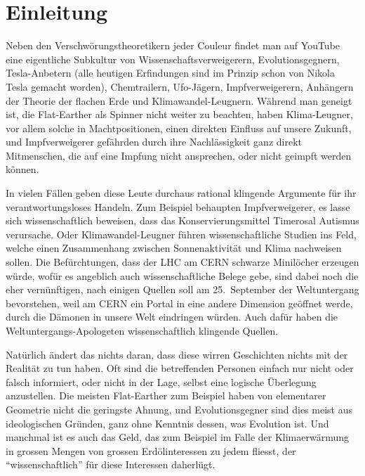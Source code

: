 %
%
%
\chapter*{Einleitung}
Neben den Verschwörungstheoretikern jeder Couleur findet man
auf YouTube eine eigentliche Subkultur von Wissenschaftsverweigerern,
Evolutionsgegnern, Tesla-Anbetern (alle heutigen Erfindungen sind im
Prinzip schon von Nikola Tesla gemacht worden), Chemtrailern, 
Ufo-Jägern,
Impfverweigerern, Anhängern der Theorie der flachen Erde
und Klimawandel-Leugnern.
Während man geneigt ist, die Flat-Earther als Spinner nicht weiter
zu beachten, haben Klima-Leugner, vor allem solche in Machtpositionen,
einen direkten Einfluss auf unsere Zukunft, und Impfverweigerer
gefährden durch ihre Nachlässigkeit ganz direkt Mitmenschen, die
auf eine Impfung nicht ansprechen, oder nicht geimpft werden können.

In vielen Fällen geben diese Leute durchaus rational klingende
Argumente für ihr verantwortungsloses Handeln.
Zum Beispiel behaupten Impfverweigerer, es lasse sich wissenschaftlich
beweisen, dass das Konservierungsmittel Timerosal Autismus verursache.
Oder Klimawandel-Leugner führen wissenschaftliche Studien ins Feld,
welche einen Zusammenhang zwischen Sonnenaktivität und Klima 
nachweisen sollen.
Die Befürchtungen, dass der LHC am CERN schwarze Minilöcher erzeugen
würde, wofür es angeblich auch wissenschaftliche Belege gebe,
sind dabei noch die eher vernünftigen, nach einigen Quellen soll
am 25.~September der Weltuntergang bevorstehen, weil am CERN ein
Portal in eine andere Dimension geöffnet werde, durch die Dämonen
in unsere Welt eindringen würden.
Auch dafür haben die Weltuntergangs-Apologeten wissenschaftlich
klingende Quellen.

Natürlich ändert das nichts daran, dass diese wirren Geschichten
nichts mit der Realität zu tun haben.
Oft sind die betreffenden Personen einfach nur nicht oder falsch
informiert, oder nicht in der Lage, selbst eine logische Überlegung
anzustellen.
Die meisten Flat-Earther zum Beispiel haben von elementarer Geometrie
nicht die geringste Ahnung, und Evolutionsgegner sind dies meist aus
ideologischen Gründen, ganz ohne Kenntnis dessen, was Evolution ist.
Und manchmal ist es auch das Geld, das zum Beispiel im Falle der 
Klimaerwärmung in grossen Mengen von grossen Erdölinteressen zu
jedem fliesst, der ``wissenschaftlich'' für diese Interessen
daherlügt.

